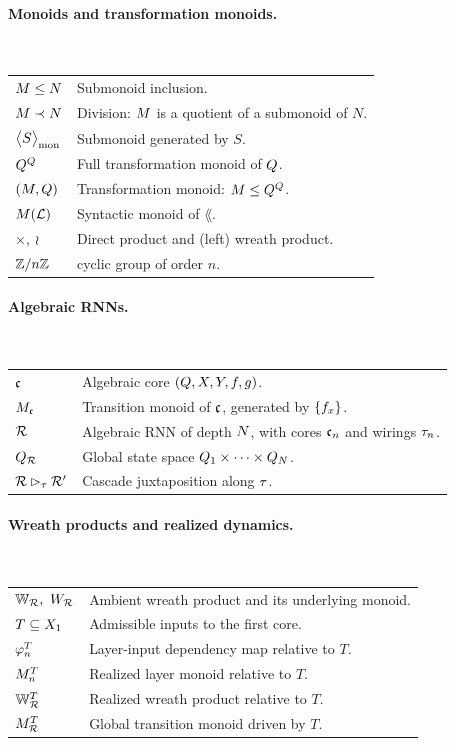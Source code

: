 \documentclass{article}
\begin{document}
\paragraph{Monoids and transformation monoids.}\mbox{}\\
\begin{tabular}{@{}p{2cm}p{12.5cm}@{}}
$M \leq N$ & Submonoid inclusion. \\
$M \prec N$ & Division: $M$ is a quotient of a submonoid of $N$. \\
$\bigl\langle S \bigr\rangle_{\mathrm{mon}}$ & Submonoid generated by $S$. \\
$Q^Q$ & Full transformation monoid of $Q$. \\
$(M, Q)$ & Transformation monoid: $M \leq Q^Q$. \\
$M(\mathcal{L})$ & Syntactic monoid of $\lang$. \\
$\times,\ \wr$ & Direct product and (left) wreath product. \\
$\mathbb{Z}/{n}\mathbb{Z}$ & cyclic group of order $n$. \\
\end{tabular}

\paragraph{Algebraic RNNs.}\mbox{}\\
\begin{tabular}{@{}p{2cm}p{12.5cm}@{}}
$\mathfrak{c}$ & Algebraic core $(Q, X, Y, f, g)$. \\
$M_{\mathfrak{c}}$ & Transition monoid of $\mathfrak{c}$, generated by $\{f_x\}$. \\
$\mathcal{R}$ & Algebraic RNN of depth $N$, with cores $\mathfrak{c}_n$ and wirings $\tau_n$. \\
$Q_{\mathcal{R}}$ & Global state space $Q_1 \times \cdots \times Q_N$. \\
$\mathcal{R} \mathbin{\rhd_{\tau}} \mathcal{R}'$ & Cascade juxtaposition along $\tau$. \\
\end{tabular}

\paragraph{Wreath products and realized dynamics.}\mbox{}\\
\begin{tabular}{@{}p{2cm}p{12.5cm}@{}}
$\wreath_\rnn,\ \wreathmon_\rnn$ & Ambient wreath product and its underlying monoid. \\
$T \subseteq X_1$ & Admissible inputs to the first core. \\
$\varphi_n^T$ & Layer-input dependency map relative to $T$. \\
$M_n^T$ & Realized layer monoid relative to $T$. \\
$\mathbb{W}_{\mathcal{R}}^T$ & Realized wreath product relative to $T$. \\
$M_{\mathcal{R}}^T$ & Global transition monoid driven by $T$. \\
\end{tabular}
\end{document}
